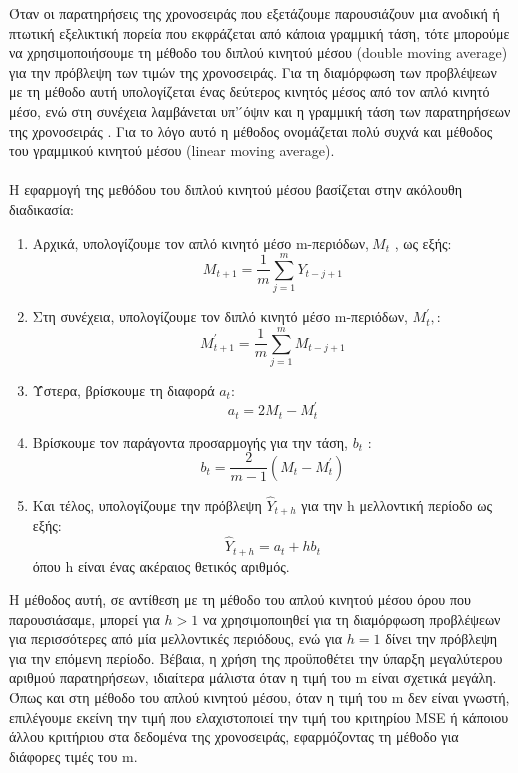 Όταν οι παρατηρήσεις της χρονοσειράς που εξετάζουμε παρουσιάζουν μια ανοδική ή πτωτική εξελικτική πορεία που εκφράζεται από κάποια γραμμική
τάση, τότε μπορούμε να χρησιμοποιήσουμε τη μέθοδο του διπλού κινητού μέσου (double moving average) για την πρόβλεψη των τιμών της χρονοσειράς. Για τη διαμόρφωση των προβλέψεων με τη μέθοδο αυτή
υπολογίζεται ένας δεύτερος κινητός μέσος από τον απλό κινητό μέσο, ενώ στη συνέχεια λαμβάνεται υπ' ́όψιν και η γραμμική τάση των παρατηρήσεων της
χρονοσειράς . Για το λόγο αυτό η μέθοδος ονομάζεται πολύ συχνά και μέθοδος του
γραμμικού κινητού μέσου (linear moving average).\\\\
Η εφαρμογή της μεθόδου του διπλού κινητού μέσου βασίζεται στην ακόλουθη
διαδικασία:\\
\begin{enumerate}
\item Αρχικά, υπολογίζουμε τον απλό κινητό μέσο m-περιόδων,$\: M_t$ , ως εξής:\\
$$ M_{t+1}=\frac{1}{m} \sum_{j=1}^m Y_{t-j+1} $$
\item Στη συνέχεια, υπολογίζουμε τον διπλό κινητό μέσο m-περιόδων, $M^{'}_t, $:\\
$$ M^{'}_{t+1}= \frac{1}{m} \sum_{j=1}^m M_{t-j+1} $$
\item Ύστερα, βρίσκουμε τη διαφορά $a_t$:\\
$$a_t=2M_t-M^{'}_t $$
\item Βρίσκουμε τον παράγοντα προσαρμογής για την τάση, $b_t$ :\\
$$ b_t=\frac{2}{m-1} \left(M_t -M^{'}_t \right)$$ 
\item Και τέλος, υπολογίζουμε την πρόβλεψη $\widehat{Y}_{t + h}$ για την h μελλοντική περίοδο ως εξής:\\
$$ \widehat{Y}_{t+h}=a_t+hb_t $$
όπου h είναι ένας ακέραιος θετικός αριθμός.\\
\end{enumerate}

Η μέθοδος αυτή, σε αντίθεση με τη μέθοδο του απλού κινητού  μέσου όρου που
παρουσιάσαμε, μπορεί για $h>1$ να χρησιμοποιηθεί για τη διαμόρφωση προβλέψεων για
περισσότερες από μία μελλοντικές περιόδους, ενώ για $h=1$ δίνει την πρόβλεψη για
την επόμενη περίοδο. Βέβαια, η χρήση της προϋποθέτει την ύπαρξη μεγαλύτερου
αριθμού παρατηρήσεων, ιδιαίτερα μάλιστα όταν η τιμή του m είναι σχετικά μεγάλη.
Όπως και στη μέθοδο του απλού κινητού μέσου, όταν η τιμή του m δεν είναι γνωστή,
επιλέγουμε εκείνη την τιμή που ελαχιστοποιεί την τιμή του κριτηρίου MSE ή κάποιου
άλλου κριτήριου στα δεδομένα της χρονοσειράς, εφαρμόζοντας τη μέθοδο για
διάφορες τιμές του m.


